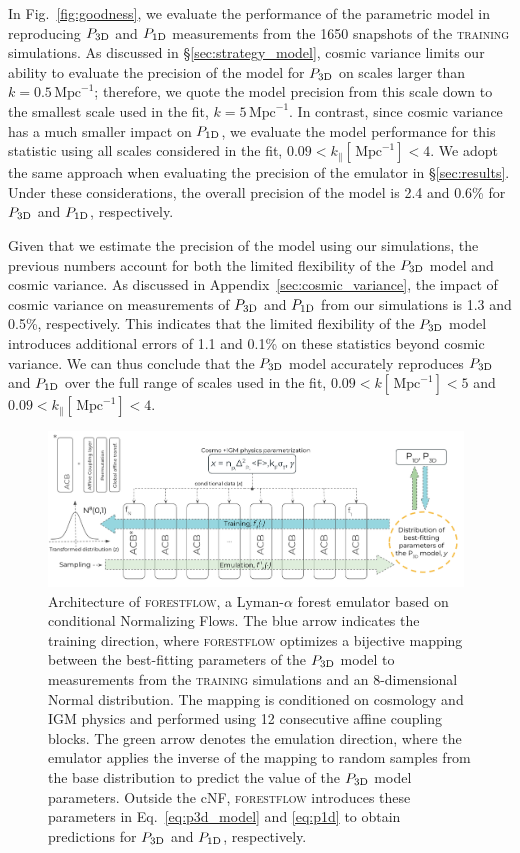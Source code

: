 \documentclass{aa}
\newcommand{\lyaf}{Lyman-$\alpha$ forest\xspace}
\newcommand{\poned}{\ensuremath{P_{\rm 1D}}\xspace}
\newcommand{\pthreed}{\ensuremath{P_{\rm 3D}}\xspace}
\newcommand{\forestflow}{\textsc{forestflow}\xspace}
\newcommand{\lacehc}{\textsc{training}\xspace}
\newcommand{\iMpc}{\ensuremath{\,\mathrm{Mpc}^{-1}}}
\begin{document}
In Fig.~\ref{fig:goodness}, we evaluate the performance of the parametric model in reproducing \pthreed and \poned measurements from the 1650 snapshots of the \lacehc simulations. As discussed in \S\ref{sec:strategy_model}, cosmic variance limits our ability to evaluate the precision of the model for \pthreed on scales larger than $k=0.5\iMpc$; therefore, we quote the model precision from this scale down to the smallest scale used in the fit, $k=5\iMpc$. In contrast, since cosmic variance has a much smaller impact on \poned, we evaluate the model performance for this statistic using all scales considered in the fit, $0.09<k_\parallel[\iMpc]<4$. We adopt the same approach when evaluating the precision of the emulator in \S\ref{sec:results}. Under these considerations, the overall precision of the model is 2.4 and 0.6\% for \pthreed and \poned, respectively. 

Given that we estimate the precision of the model using our simulations, the previous numbers account for both the limited flexibility of the \pthreed model and cosmic variance. As discussed in Appendix~\ref{sec:cosmic_variance}, the impact of cosmic variance on measurements of \pthreed and \poned from our simulations is 1.3 and 0.5\%, respectively. This indicates that the limited flexibility of the \pthreed model introduces additional errors of 1.1 and 0.1\% on these statistics beyond cosmic variance. We can thus conclude that the \pthreed model accurately reproduces \pthreed and \poned over the full range of scales used in the fit, $0.09<k[\iMpc]<5$ and $0.09<k_\parallel[\iMpc]<4$.


\begin{figure}
    \includegraphics[width= 0.98\textwidth]{figures/network_architecture.png} 
    \centering
    \caption{Architecture of \forestflow, a \lyaf emulator based on conditional Normalizing Flows. The blue arrow indicates the training direction, where \forestflow optimizes a bijective mapping between the best-fitting parameters of the \pthreed model to measurements from the \lacehc simulations and an 8-dimensional Normal distribution. The mapping is conditioned on cosmology and IGM physics and performed using 12 consecutive affine coupling blocks. The green arrow denotes the emulation direction, where the emulator applies the inverse of the mapping to random samples from the base distribution to predict the value of the \pthreed model parameters. Outside the cNF, \forestflow introduces these parameters in Eq.~\ref{eq:p3d_model} and \ref{eq:p1d} to obtain predictions for \pthreed and \poned, respectively.}
    \label{fig:net_architecture}
 \end{figure}
\end{document}
